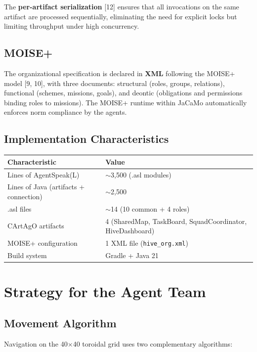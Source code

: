 \documentclass[11pt,a4paper]{article}
\newcommand{\code}[1]{\texttt{#1}}
\begin{document}
The \textbf{per-artifact serialization} [12] ensures that all invocations on the same artifact are processed sequentially, eliminating the need for explicit locks but limiting throughput under high concurrency.

\subsection{MOISE+}
The organizational specification is declared in \textbf{XML} following the MOISE+ model [9, 10], with three documents: structural (roles, groups, relations), functional (schemes, missions, goals), and deontic (obligations and permissions binding roles to missions). The MOISE+ runtime within JaCaMo automatically enforces norm compliance by the agents.

\subsection{Implementation Characteristics}
\begin{table}[H]
\centering
\begin{tabularx}{\linewidth}{X l}
\toprule
\textbf{Characteristic} & \textbf{Value} \\
\midrule
Lines of AgentSpeak(L) & $\sim$3{,}500 (.asl modules) \\
Lines of Java (artifacts + connection) & $\sim$2{,}500 \\
.asl files & $\sim$14 (10 common + 4 roles) \\
CArtAgO artifacts & 4 (SharedMap, TaskBoard, SquadCoordinator, HiveDashboard) \\
MOISE+ configuration & 1 XML file (\code{hive\_org.xml}) \\
Build system & Gradle + Java 21 \\
\bottomrule
\end{tabularx}
\end{table}

\section{Strategy for the Agent Team}

\subsection{Movement Algorithm}
Navigation on the 40$\times$40 toroidal grid uses two complementary algorithms:
\end{document}
